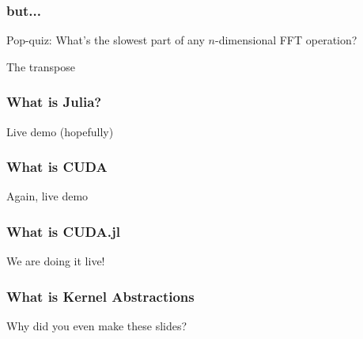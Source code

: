 \documentclass{beamer}
\begin{document}
\begin{frame}
\frametitle{but...}

\begin{centering}
Pop-quiz: 
What's the slowest part of any $n$-dimensional FFT operation?
\end{centering}

\pause
\center The transpose
\end{frame}

\begin{frame}
\frametitle{What is Julia?}

\center Live demo (hopefully)

\end{frame}

\begin{frame}
\frametitle{What is CUDA}

\center Again, live demo
\end{frame}

\begin{frame}
\frametitle{What is CUDA.jl}

\center We are doing it live!
\end{frame}

\begin{frame}
\frametitle{What is Kernel Abstractions}

\center Why did you even make these slides?
\end{frame}
\end{document}
